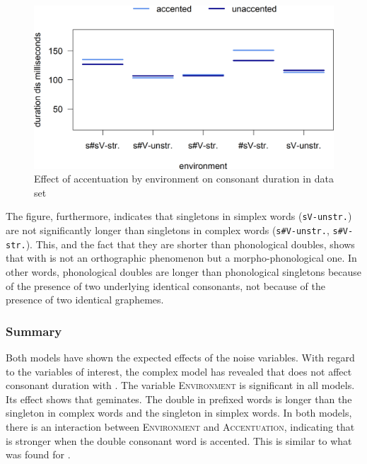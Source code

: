 \begin{figure}
	
	\includegraphics [scale=0.5] {images/Experiment/disModelCompleteinterEnvAcc}
	\caption{Effect of accentuation by environment on consonant duration in data set}
	\label{fig:  dis experiment Env and accent}
\end{figure}


\hspace*{-0.27794pt}The figure, furthermore, indicates that singletons in simplex words (\texttt{sV-unstr.}) are not significantly longer than singletons in complex words (\texttt{s\#V-unstr.}, \texttt{s\#V- str.}). This, and the fact that they are shorter than phonological doubles, shows that  with  is not an orthographic phenomenon but a morpho-phonological one. In other words, phonological doubles are longer than phonological singletons because of the presence of two underlying identical consonants, not because of the presence of two identical graphemes.



\subsubsection{Summary}

Both models have shown the expected effects of the noise variables. With regard to the variables of interest, the complex model has revealed that  does not affect consonant duration with . The variable \textsc{Environment} is significant in all models. Its effect shows that  geminates. The double in prefixed words is longer than the singleton in complex words and the singleton in simplex words. 
In both models, there is an interaction between \textsc{Environment} and \textsc{Accentuation}, indicating that  is stronger when the double consonant word is accented. This is similar to what was found for .


